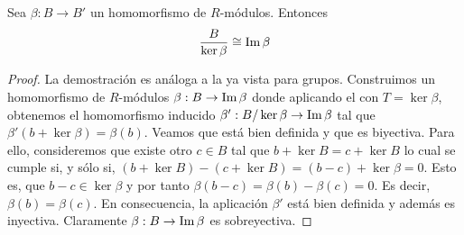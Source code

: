 \begin{teorema}
	\label{teo:first-iso}
	Sea $\beta : B \to B'$ un homomorfismo de $R$-módulos. Entonces
	\[
		\frac{B}{\ker \beta} \cong \operatorname{Im} \beta
	\]
\end{teorema}
\begin{proof}
	La demostración es análoga a la ya vista para grupos. Construimos un homomorfismo de $R$-módulos $\beta: B \to \operatorname{Im} \beta$ donde aplicando el  con $T = \ker \beta$, obtenemos el homomorfismo inducido $\beta' : B/\ker \beta \to \operatorname{Im} \beta$ tal que $\beta'(b+\ker \beta) = \beta(b)$. Veamos que está bien definida y que es biyectiva. Para ello, consideremos que existe otro $c \in B$ tal que $b + \ker B = c + \ker B$ lo cual se cumple si, y sólo si, $(b + \ker B) - (c + \ker B) = (b - c) + \ker \beta = 0$. Esto es, que $b - c \in \ker \beta$ y por tanto $\beta(b-c) = \beta(b) - \beta(c) = 0$. Es decir, $\beta(b) = \beta(c)$. En consecuencia, la aplicación $\beta'$ está bien definida y además es inyectiva. Claramente $\beta: B \to \operatorname{Im} \beta$ es sobreyectiva.
\end{proof}
%
